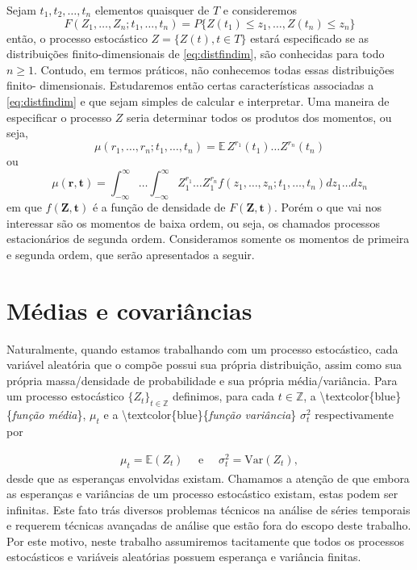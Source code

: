 \documentclass[
]{book}
\theoremstyle{definition}
\theoremstyle{definition}
\theoremstyle{definition}
\theoremstyle{remark}
\begin{document}
Sejam \(t_1,t_2,\ldots,t_n\) elementos quaisquer de \(T\) e consideremos
\begin{equation}
F(Z_1,\ldots,Z_n; t_1,\ldots, t_n ) = P \{Z(t_1 )\leq z_1,\ldots, Z(t_n) \leq z_n \}
\label{eq:distfindim}
\end{equation}
então, o processo estocástico \(Z = \{Z(t), t \in T \}\) estará especificado se as distribuições
finito-dimensionais de \eqref{eq:distfindim}, são conhecidas para todo \(n\geq 1\).
Contudo, em termos práticos, não conhecemos todas essas distribuições finito-
dimensionais. Estudaremos então certas características associadas a \eqref{eq:distfindim} e que
sejam simples de calcular e interpretar. Uma maneira de especificar o processo \(Z\) seria determinar todos os produtos dos
momentos, ou seja,
\begin{equation}
\mu(r_1 ,\ldots, r_n; t_1,\ldots, t_n ) = \mathbb{E \,} Z^{r_1}(t_1 )\ldots Z^{r_n}(t_n)
\label{eq:prodmom}
\end{equation}
ou
\begin{equation}
\mu(\textbf{r},\textbf{t})=\int_{-\infty}^{\infty}\ldots\int_{-\infty}^{\infty}
                      Z^{r_1}_1\ldots Z^{r_n}_1 f(z_1,\ldots,z_n; t_1,\ldots,t_n)dz_1\ldots dz_n
\end{equation}
em que \(f(\textbf{Z},\textbf{t})\) é a função de densidade de \(F(\textbf{Z}, \textbf{t})\). Porém o que vai nos interessar são os momentos de baixa ordem, ou seja, os chamados processos estacionários de segunda ordem. Consideramos somente os momentos de primeira e segunda ordem, que serão apresentados a seguir.

\hypertarget{muxe9dias-e-covariuxe2ncias}{%
\section{Médias e covariâncias}\label{muxe9dias-e-covariuxe2ncias}}

Naturalmente, quando estamos trabalhando com um processo estocástico, cada variável aleatória que o compõe possui sua própria distribuição, assim como sua própria massa/densidade de probabilidade e sua própria média/variância. Para um processo estocástico \(\{Z_t\}_{t\in\mathbb{Z}}\) definimos, para cada \(t\in\mathbb{Z}\), a \textbackslash textcolor\{blue\}\{\emph{função média}\}, \(\mu_t\) e a \textbackslash textcolor\{blue\}\{\emph{função variância}\} \(\sigma^2_t\) respectivamente por

\begin{align}
\mu_t = \mathbb{E} (Z_t) \quad \mbox{ e }\quad \sigma_t^2=\mbox{Var}(Z_t),
\label{eq:funcmed}
\end{align}
desde que as esperanças envolvidas existam. Chamamos a atenção de que embora as esperanças e variâncias de um processo estocástico existam, estas podem ser infinitas. Este fato trás diversos problemas técnicos na análise de séries temporais e requerem técnicas avançadas de análise que estão fora do escopo deste trabalho. Por este motivo, neste trabalho assumiremos tacitamente que todos os processos estocásticos e variáveis aleatórias possuem esperança e variância finitas.
\end{document}
